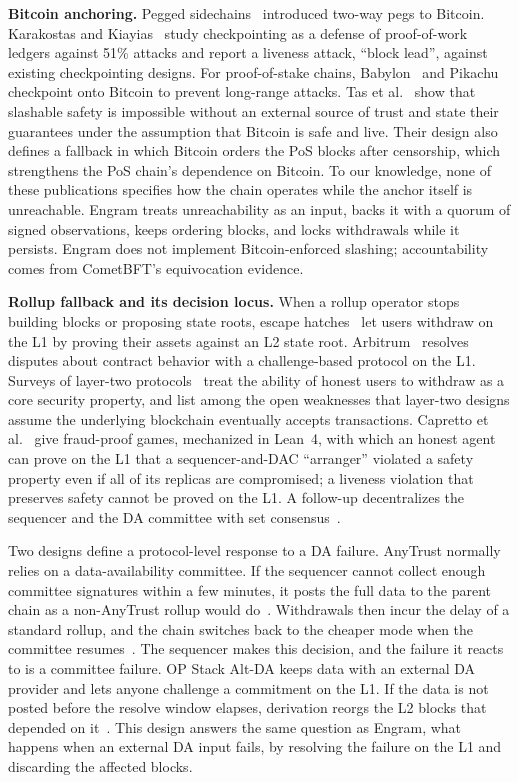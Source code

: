 \textbf{Bitcoin anchoring.}
Pegged sidechains~\cite{back2014sidechains} introduced two-way pegs to Bitcoin.
Karakostas and Kiayias~\cite{karakostas2021checkpointing} study checkpointing
as a defense of proof-of-work ledgers against 51\% attacks and report a
liveness attack, ``block lead'', against existing checkpointing designs. For
proof-of-stake chains, Babylon~\cite{tas2022babylon,tas2023bitcoinpos} and
Pikachu~\cite{azouvi2022pikachu} checkpoint onto Bitcoin to prevent long-range
attacks. Tas et al.~\cite{tas2023bitcoinpos} show that slashable safety is
impossible without an external source of trust and state their guarantees under
the assumption that Bitcoin is safe and live. Their design also defines a
fallback in which Bitcoin orders the PoS blocks after censorship, which
strengthens the PoS chain's dependence on Bitcoin. To our knowledge, none of
these publications specifies how the chain operates while the anchor itself is
unreachable. Engram treats unreachability as an input, backs it with a quorum of signed
observations, keeps ordering blocks, and locks withdrawals while it persists. Engram does not implement
Bitcoin-enforced slashing; accountability comes from CometBFT's equivocation
evidence.

\textbf{Rollup fallback and its decision locus.}
When a rollup operator stops building blocks or proposing state roots, escape
hatches~\cite{figueira2025escapehatch} let users withdraw on the
L1 by proving their assets against an L2 state root. Arbitrum~\cite{kalodner2018arbitrum} resolves disputes about contract behavior
with a challenge-based protocol on the L1. Surveys of layer-two
protocols~\cite{gudgeon2020sok} treat the ability of honest users to withdraw as
a core security property, and list among the open weaknesses that layer-two
designs assume the underlying blockchain eventually accepts transactions.
Capretto et al.~\cite{capretto2025secure} give fraud-proof games,
mechanized in Lean~4, with which an honest agent can prove on the L1 that a
sequencer-and-DAC ``arranger'' violated a safety property even if all of its
replicas are compromised; a liveness violation that preserves safety cannot be
proved on the L1. A follow-up decentralizes the sequencer and the DA committee
with set consensus~\cite{capretto2026setconsensus}.

Two designs define a protocol-level response to a DA failure. AnyTrust
normally relies on a data-availability committee. If the
sequencer cannot collect enough committee signatures within a few minutes, it
posts the full data to the parent chain as a non-AnyTrust rollup would
do~\cite{arbitrum_anytrust}. Withdrawals then incur the delay of a standard
rollup, and the chain switches back to the cheaper mode when the committee
resumes~\cite{arbitrum_orbit_anytrust}. The sequencer makes this decision, and the
failure it reacts to is a committee failure. OP Stack Alt-DA keeps data with an
external DA provider and lets anyone challenge a commitment on the L1. If the
data is not posted before the resolve window elapses, derivation reorgs the
L2 blocks that depended on it~\cite{optimism_altda}. This design answers the same
question as Engram, what happens when an external DA input fails, by
resolving the failure on the L1 and discarding the affected blocks.


